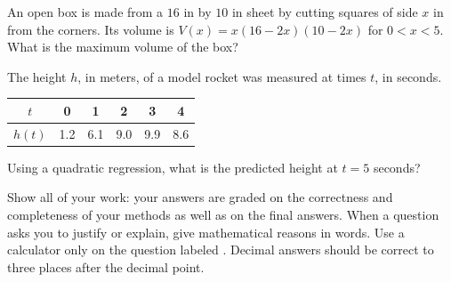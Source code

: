 \documentclass[11pt]{article}
\begin{document}
\begin{exo}[1.14]{\calcreq}
An open box is made from a $16$ in by $10$ in sheet by cutting squares of side $x$ in from the corners. Its volume is $V(x)=x(16-2x)(10-2x)$ for $0<x<5$. What is the maximum volume of the box?
\end{exo}

\begin{exo}[1.14]{\calcreq}
The height $h$, in meters, of a model rocket was measured at times $t$, in seconds.
\begin{center}\begin{tabular}{c|ccccc}
$t$ & 0 & 1 & 2 & 3 & 4\\\hline $h(t)$ & 1.2 & 6.1 & 9.0 & 9.9 & 8.6\end{tabular}\end{center}
Using a quadratic regression, what is the predicted height at $t=5$ seconds?
\end{exo}

\begin{directions}
Show all of your work: your answers are graded on the correctness and completeness of your methods as well as on the final answers. When a question asks you to justify or explain, give mathematical reasons in words. Use a calculator only on the question labeled \calctext. Decimal answers should be correct to three places after the decimal point.
\end{directions}
\end{document}
